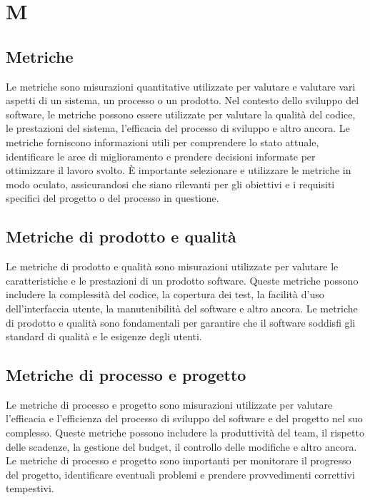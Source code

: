 \section{M}
\vspace{2em}
\subsection*{Metriche}
Le metriche sono misurazioni quantitative utilizzate per valutare e valutare vari aspetti di un sistema, un processo o un prodotto. Nel contesto dello sviluppo del software, le metriche possono essere utilizzate per valutare la qualità del codice, le prestazioni del sistema, l'efficacia del processo di sviluppo e altro ancora. Le metriche forniscono informazioni utili per comprendere lo stato attuale, identificare le aree di miglioramento e prendere decisioni informate per ottimizzare il lavoro svolto. È importante selezionare e utilizzare le metriche in modo oculato, assicurandosi che siano rilevanti per gli obiettivi e i requisiti specifici del progetto o del processo in questione.

\vspace{2em}
\subsection*{Metriche di prodotto e qualità}

Le metriche di prodotto e qualità sono misurazioni utilizzate per valutare le caratteristiche e le prestazioni di un prodotto software. Queste metriche possono includere la complessità del codice, la copertura dei test, la facilità d'uso dell'interfaccia utente, la manutenibilità del software e altro ancora. Le metriche di prodotto e qualità sono fondamentali per garantire che il software soddisfi gli standard di qualità e le esigenze degli utenti.

\vspace{2em}
\subsection*{Metriche di processo e progetto}

Le metriche di processo e progetto sono misurazioni utilizzate per valutare l'efficacia e l'efficienza del processo di sviluppo del software e del progetto nel suo complesso. Queste metriche possono includere la produttività del team, il rispetto delle scadenze, la gestione del budget, il controllo delle modifiche e altro ancora. Le metriche di processo e progetto sono importanti per monitorare il progresso del progetto, identificare eventuali problemi e prendere provvedimenti correttivi tempestivi.

